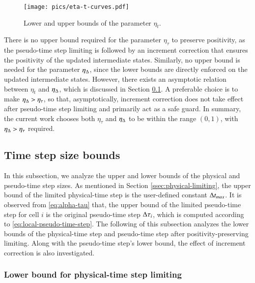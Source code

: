 \begin{figure}[htbp!]
    \centering
    \texttt{[image: pics/eta-t-curves.pdf]}
    \caption{Lower and upper bounds of the parameter $\eta_t$.}
    \label{fig:eta-t-curves}
\end{figure}

There is no upper bound required for the parameter $\eta_\tau$ to preserve positivity, 
as the pseudo-time step limiting is followed by an increment correction 
that ensures the positivity of the updated intermediate states. 
Similarly, no upper bound is needed for the parameter $\eta_{\mathrm\Delta}$, 
since the lower bounds are directly enforced on the updated intermediate states. 
However, there exists an asymptotic relation between $\eta_t$ and $\eta_\mathrm\Delta$,
which is discussed in Section \ref{ssec:analysis-time-step}.
A preferable choice is to make $\eta_\mathrm\Delta > \eta_\tau$, so that,
asymptotically, increment correction does not take effect after 
pseudo-time step limiting and primarily act as a safe guard.
In summary, the current work 
chooses both $\eta_\tau$ and $\eta_{\mathrm\Delta}$ to be within the range $(0,1)$, 
with $\eta_\mathrm\Delta > \eta_\tau$ required. 

\subsection{Time step size bounds}
\label{ssec:analysis-time-step}
In this subsection, we analyze the upper and lower bounds of the physical and pseudo-time step sizes. As mentioned in Section \ref{ssec:physical-limiting}, the upper bound of the limited physical-time step is the user-defined constant $\mathrm\Delta t_{max}$.
It is observed from \eqref{eq:alpha-tau} that, the upper bound of the limited pseudo-time step for cell $i$ is the original pseudo-time step $\mathrm\Delta \tau_i$, which is computed according to \eqref{eq:local-pseudo-time-step}. 
The following of this subsection analyzes the lower bounds
of the physical-time step and pseudo-time step after positivity-preserving limiting. 
Along with the pseudo-time step's lower bound, the effect of 
increment correction is also investigated.

\subsubsection{Lower bound for physical-time step limiting}

